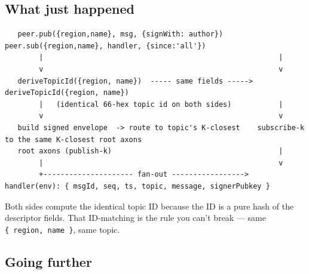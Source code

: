 \documentclass[
  nobib]{tufte-handout}
\begin{document}
\subsection{What just happened}\label{what-just-happened}

\begin{verbatim}
   peer.pub({region,name}, msg, {signWith: author})        peer.sub({region,name}, handler, {since:'all'})
        |                                                       |
        v                                                       v
   deriveTopicId({region, name})  ----- same fields ----->  deriveTopicId({region, name})
        |   (identical 66-hex topic id on both sides)           |
        v                                                       v
   build signed envelope  -> route to topic's K-closest    subscribe-k to the same K-closest root axons
   root axons (publish-k)                                       |
        |                                                       v
        +--------------------- fan-out ----------------->  handler(env): { msgId, seq, ts, topic, message, signerPubkey }
\end{verbatim}

Both sides compute the identical topic ID because the ID is a pure hash
of the descriptor fields. That ID-matching is the rule you can't break
--- same \texttt{\{\ region,\ name\ \}}, same topic.

\subsection{Going further}\label{going-further}
\end{document}
